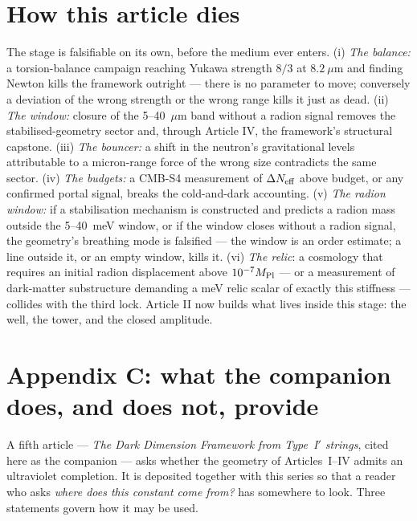 \section{How this article dies}
The stage is falsifiable on its own, before the medium ever enters. (i) \emph{The balance:} a torsion-balance campaign reaching Yukawa strength $8/3$ at $8.2~\mu$m and finding Newton kills the framework outright --- there is no parameter to move; conversely a deviation of the wrong strength or the wrong range kills it just as dead. (ii) \emph{The window:} closure of the 5--40~$\mu$m band without a radion signal removes the stabilised-geometry sector and, through Article IV, the framework's structural capstone. (iii) \emph{The bouncer:} a shift in the neutron's gravitational levels attributable to a micron-range force of the wrong size contradicts the same sector. (iv) \emph{The budgets:} a CMB-S4 measurement of $\Delta N_{\rm eff}$ above budget, or any confirmed portal signal, breaks the cold-and-dark accounting. (v) \emph{The radion window:} if a stabilisation mechanism is constructed and predicts a radion mass outside the 5--40~meV window, or if the window closes without a radion signal, the geometry's breathing mode is falsified --- the window is an order estimate; a line outside it, or an empty window, kills it. (vi) \emph{The relic}: a cosmology that requires an initial radion displacement above $10^{-7}M_{\rm Pl}$ --- or a measurement of dark-matter substructure demanding a meV relic scalar of exactly this stiffness --- collides with the third lock. Article II now builds what lives inside this stage: the well, the tower, and the closed amplitude.



\toolsstatement
{}


\section*{Appendix C: what the companion does, and does not, provide}
\label{app:companion}

A fifth article --- \emph{The Dark Dimension Framework from Type~I$'$ strings}, cited here as the companion --- asks whether the geometry of Articles~I--IV admits an ultraviolet completion. It is deposited together with this series so that a reader who asks \emph{where does this constant come from?} has somewhere to look. Three statements govern how it may be used.

